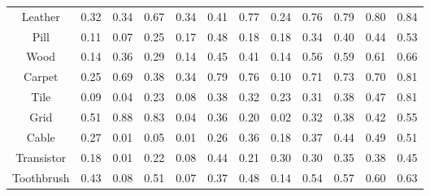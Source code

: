 \documentclass[runningheads]{llncs}
\begin{document}
\begin{table}[t]
\begin{center}
\begin{tabular}{cccccccccccc}
Leather  &\cellcolor{blue!15}0.32 &\cellcolor{blue!20}0.34  &\cellcolor{blue!30}0.67 &\cellcolor{blue!20}0.34 &\cellcolor{blue!25}0.41 &\cellcolor{blue!50}0.77 &\cellcolor{blue!5}0.24  &\cellcolor{blue!40}0.76 &\cellcolor{blue!60}0.79  &\cellcolor{blue!70}0.80 &\cellcolor{blue!80}\color{white}0.84\\
Pill    &\cellcolor{blue!15}0.11  &\cellcolor{blue!10}0.07  &\cellcolor{blue!30}0.25 &\cellcolor{blue!20}0.17 &\cellcolor{blue!70}0.48 &\cellcolor{blue!25}0.18    &\cellcolor{blue!25}0.18  &\cellcolor{blue!40}0.34  &\cellcolor{blue!50}0.40 &\cellcolor{blue!60}0.44 &\cellcolor{blue!80}\color{white}0.53\\
Wood    &\cellcolor{blue!10}0.14    &\cellcolor{blue!25}0.36  &\cellcolor{blue!20}0.29 &\cellcolor{blue!10}0.14 &\cellcolor{blue!40}0.45 &\cellcolor{blue!30}0.41 &\cellcolor{blue!10}0.14  &\cellcolor{blue!50}0.56  &\cellcolor{blue!60}0.59 &\cellcolor{blue!70}0.61 &\cellcolor{blue!80}\color{white}0.66\\
		
		Carpet &\cellcolor{blue!10}0.25   &\cellcolor{blue!25}0.69  &\cellcolor{blue!20}0.38 &\cellcolor{blue!15}0.34 &\cellcolor{blue!70}0.79 &\cellcolor{blue!60}0.76 &\cellcolor{blue!5}0.10  &\cellcolor{blue!40}0.71  &\cellcolor{blue!50}0.73 &\cellcolor{blue!30}0.70 &\cellcolor{blue!80}\color{white}0.81\\
Tile  &\cellcolor{blue!20}0.09    &\cellcolor{blue!5}0.04  &\cellcolor{blue!30}0.23 &\cellcolor{blue!10}0.08 &\cellcolor{blue!60}0.38 &\cellcolor{blue!50}0.32 &\cellcolor{blue!30}0.23  &\cellcolor{blue!40}0.31  &\cellcolor{blue!60}0.38 &\cellcolor{blue!70}0.47 &\cellcolor{blue!80}\color{white}0.81\\
Grid  &\cellcolor{blue!50}0.51    &\cellcolor{blue!80}\color{white}0.88  &\cellcolor{blue!70}0.83 &\cellcolor{blue!10}0.04 &\cellcolor{blue!25}0.36 &\cellcolor{blue!15}0.20 &\cellcolor{blue!5}0.02 &\cellcolor{blue!20}0.32  &\cellcolor{blue!30}0.38 &\cellcolor{blue!40}0.42 &\cellcolor{blue!60}0.55\\
Cable &\cellcolor{blue!30}0.27    &\cellcolor{blue!10}0.01  &\cellcolor{blue!15}0.05 &\cellcolor{blue!10}0.01 &\cellcolor{blue!25}0.26 &\cellcolor{blue!40}0.36    &\cellcolor{blue!20}0.18  &\cellcolor{blue!50}0.37  &\cellcolor{blue!60}0.44 &\cellcolor{blue!70}0.49 &\cellcolor{blue!80}\color{white}0.51\\
Transistor &\cellcolor{blue!20}0.18 &\cellcolor{blue!10}0.01  &\cellcolor{blue!30}0.22 &\cellcolor{blue!15}0.08 &\cellcolor{blue!70}0.44 &\cellcolor{blue!25}0.21    &\cellcolor{blue!40}0.30  &\cellcolor{blue!40}0.30  &\cellcolor{blue!50}0.35  &\cellcolor{blue!60}0.38 &\cellcolor{blue!80}\color{white}0.45\\
Toothbrush &\cellcolor{blue!25}0.43 &\cellcolor{blue!10}0.08  &\cellcolor{blue!40}0.51 &\cellcolor{blue!5}0.07 &\cellcolor{blue!20}0.37 &\cellcolor{blue!30}0.48    &\cellcolor{blue!15}0.14  &\cellcolor{blue!50}0.54 &  \cellcolor{blue!60}0.57 &\cellcolor{blue!70}0.60 &\cellcolor{blue!80}\color{white}0.63\\
		

\end{tabular}
\end{center}
\end{table}
\end{document}
